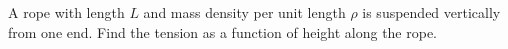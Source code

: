 A rope with length $L$ and mass density per unit length $\rho$ is suspended vertically from one end. Find the tension as a function of height along the rope.